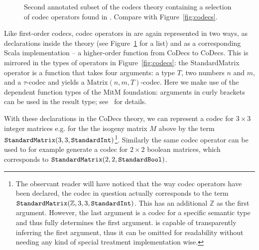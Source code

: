 \begin{figure}[ht]\centering
  \caption[List of Codec Operators]{
    Second annotated subset of the codecs theory containing a selection of codec operators found in \mmt. 
    Compare with Figure~\ref{fig:codecs}. 
  }
  \label{fig:codecops}
\end{figure}
Like first-order codecs, codec operators in \mmt are again represented in two ways, as
declarations inside the  theory (see Figure~\ref{fig:codecops} for a
list) and as a corresponding Scala implementation -- a higher-order function from CoDecs
to CoDecs. This is mirrored in the types of operators in Figure~\ref{fig:codecs}: the
\textsf{StandardMatrix} operator is a function that takes four arguments: a type $T$, two
numbers $n$ and $m$, and a $\tau$-codec and yields a $\mathrm{Matrix}(n, m,
T)$-codec. Here we make use of the dependent function types of the MitM foundation:
arguments in curly brackets can be used in the result type; see~\cite{RabKoh:WSMSML13} for
details.

With these declarations in the \textsf{CoDecs} theory, we can represent a codec for
$3 \times 3$ integer matrices e.g. for the the isogeny matrix $M$ above by the \ommt term
$\plaintt{StandardMatrix}(3, 3, \plaintt{StandardInt})$\footnote{The observant reader will
  have noticed that the way codec operators have been declared, the codec in question
  actually corresponds to the term
  $\plaintt{StandardMatrix}(\mathbb{Z}, 3, 3, \plaintt{StandardInt})$.  This has an
  additional $\mathbb{Z}$ as the first argument.  However, the last argument is a codec
  for a specific semantic type and thus fully determines the first argument.  \mmt is
  capable of transparently inferring the first argument, thus it can be omitted for
  readability without needing any kind of special treatment implementation wise.  }.
Similarly the same codec operator can be used to for example generate a codec for
$2 \times 2$ boolean matrices, which corresponds to
$\plaintt{StandardMatrix}(2, 2, \plaintt{StandardBool})$.



